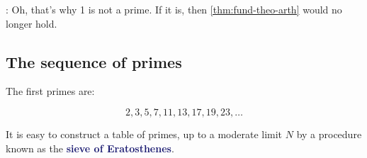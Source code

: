 \documentclass[dvipsnames]{article}
\newcommand{\mycola}{MidnightBlue}
\newcommand{\Cola}[1]{\textcolor{\mycola}{\textbf{#1}}}
\begin{document}
 : Oh, that's why 1 is not a prime. If it is, then
\cref{thm:fund-theo-arth} would no longer hold.

\subsection{The sequence of primes}

The first primes are:

\[2, 3, 5, 7, 11, 13, 17, 19, 23, \dotsc{}\]

It is easy to construct a table of primes, up to a moderate limit $N$ by a
procedure known as the \Cola{sieve of Eratosthenes}.
\end{document}
